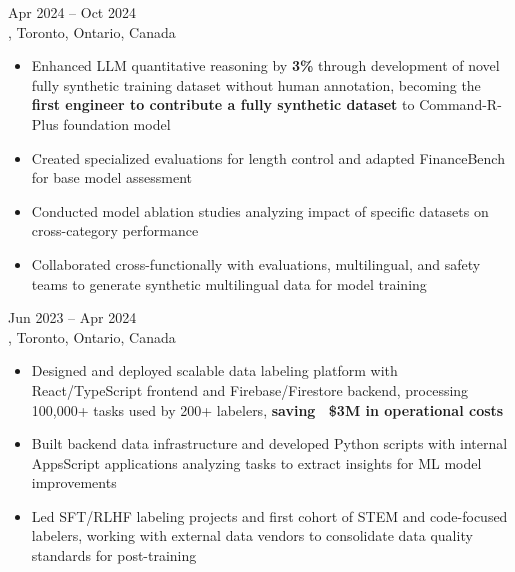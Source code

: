 \documentclass[letterpaper,10pt]{article}
\begin{document}
\hspace{0.15in}{\large\bfseries Machine Learning Engineer Intern} \hfill {\small Apr 2024 -- Oct 2024} \\
\hspace{0.15in}{\bfseries Cohere}, Toronto, Ontario, Canada
\vspace{-1pt}
\begin{itemize}[leftmargin=0.35in, itemsep=-1pt, topsep=1pt, labelsep=0.035in]
\item Enhanced LLM quantitative reasoning by \textbf{3\%} through development of novel fully synthetic training dataset without human annotation, becoming the \textbf{first engineer to contribute a fully synthetic dataset} to Command-R-Plus foundation model
\item Created specialized evaluations for length control and adapted FinanceBench for base model assessment
\item Conducted model ablation studies analyzing impact of specific datasets on cross-category performance
\item Collaborated cross-functionally with evaluations, multilingual, and safety teams to generate synthetic multilingual data for model training
\end{itemize}
\vspace{1pt}

\hspace{0.15in}{\large\bfseries Senior Data Quality Team Lead} \hfill {\small Jun 2023 -- Apr 2024} \\
\hspace{0.15in}{\bfseries Cohere}, Toronto, Ontario, Canada
\vspace{-1pt}
\begin{itemize}[leftmargin=0.35in, itemsep=-1pt, topsep=1pt, labelsep=0.035in]
\item Designed and deployed scalable data labeling platform with React/TypeScript frontend and Firebase/Firestore backend, processing 100,000+ tasks used by 200+ labelers, \textbf{saving ~\$3M in operational costs}
\item Built backend data infrastructure and developed Python scripts with internal AppsScript applications analyzing tasks to extract insights for ML model improvements
\item Led SFT/RLHF labeling projects and first cohort of STEM and code-focused labelers, working with external data vendors to consolidate data quality standards for post-training
\end{itemize}
\vspace{1pt}
\end{document}
